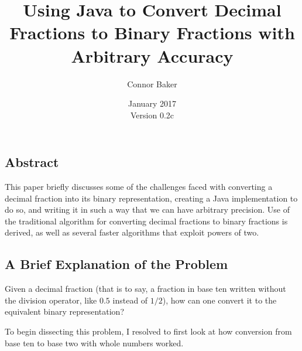 \documentclass[12pt]{article}
\begin{document}

  \title{Using Java to Convert Decimal Fractions to Binary Fractions with Arbitrary Accuracy}
  \author{Connor Baker}
  \date{January 2017\\Version 0.2c}
\maketitle

\begin{center}
\subsection*{Abstract}
\end{center}
This paper briefly discusses some of the challenges faced with converting a decimal fraction into its binary representation, creating a Java implementation to do so, and writing it in such a way that we can have arbitrary precision. Use of the traditional algorithm for converting decimal fractions to binary fractions is derived, as well as several faster algorithms that exploit powers of two.



\newpage %



\makeatletter
{}
\makeatother
\tableofcontents

\clearpage
{}



\newpage %



\begin{center}
\section{A Brief Explanation of the Problem}
\end{center}
Given a decimal fraction (that is to say, a fraction in base ten written without the division operator, like $0.5$ instead of $1/2$), how can one convert it to the equivalent binary representation?

\par To begin dissecting this problem, I resolved to first look at how conversion from base ten to base two with whole numbers worked.
\end{document}
